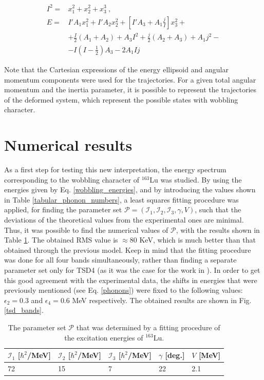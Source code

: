 \documentclass[%
 reprint,
 amsmath,
 amssymb,
 aps,
 floatfix,
]{revtex4-2}
\begin{document}
\begin{align}
    I^2=&x_1^2+x_2^2+x_3^3\ ,\\
    E=&I'A_1x_1^2+I'A_2x_2^2+\left[I'A_3+A_1\frac{j}{I}\right]x_3^2+ \nonumber \\
    &+\frac{I}{2}(A_1+A_2)+A_3I^2+\frac{j}{2}(A_2+A_3)+A_1j^2- \nonumber \\
    &-I\left(I-\frac{1}{2}\right)A_3-2A_1Ij \label{ellipsoid_rotation}
\end{align}

Note that the Cartesian expressions of the energy ellipsoid and angular momentum components were used for the trajectories. For a given total angular momentum and the inertia parameter, it is possible to represent the trajectories of the deformed system, which represent the possible states with wobbling character.

\section{Numerical results}

As a first step for testing this new interpretation, the energy spectrum corresponding to the wobbling character of $^{163}$Lu was studied. By using the energies given by Eq. \ref{wobbling_energies}, and by introducing the values shown in Table \ref{tabular_phonon_numbers}, a least squares fitting procedure was applied, for finding the parameter set $\mathcal{P}=(\mathcal{I}_1,\mathcal{I}_2,\mathcal{I}_3,\gamma,V)$, such that the deviations of the theoretical values from the experimental ones \cite{odegaard2001evidence} are minimal. Thus, it was possible to find the numerical values of $\mathcal{P}$, with the results shown in Table \ref{parameter_set}. The obtained RMS value is $\approx 80$ KeV, which is much better than that obtained through the previous model. Keep in mind that the fitting procedure was done for all four bands simultaneously, rather than finding a separate parameter set only for TSD4 (as it was the case for the work in \cite{raduta2020new}). In order to get this good agreement with the experimental data, the shifts in energies that were previously mentioned (see Eq. \ref{phonons}) were fixed to the following values: $\epsilon_2=0.3$ and $\epsilon_4=0.6$ MeV respectively. The obtained results are shown in Fig. \ref{tsd_bands}.

\begin{table}[h]
    \centering
  \begin{tabular}{lllll}
  \hline
$\mathcal{I}_1$ [$\hbar^2$/MeV] & $\mathcal{I}_2$ [$\hbar^2$/MeV]& $\mathcal{I}_3$ [$\hbar^2$/MeV] & $\gamma$ [deg.] & $V$ [MeV] \\
\hline
\hline
72              & 15              & 7               & 22       & 2.1
\end{tabular}
    \caption{The parameter set $\mathcal{P}$ that was determined by a fitting procedure of the excitation energies of $^{163}$Lu.}
    \label{parameter_set}
\end{table}
\end{document}
